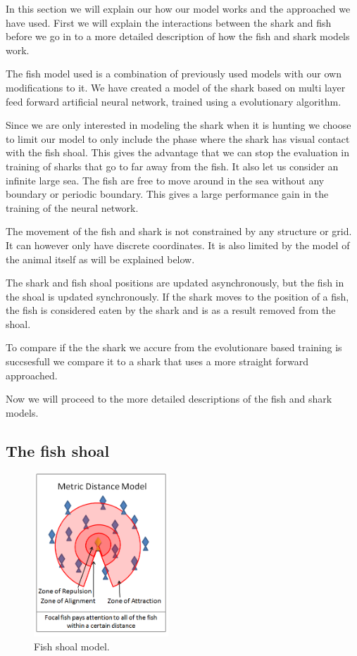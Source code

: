 
In this section we will explain our how our model works and the approached we have used. First we will explain the interactions between the shark and fish before we go in to a more detailed description of how the fish and shark models work.

The fish model used is a combination of previously used models with our own modifications to it. We have created a model of the shark based on multi layer feed forward artificial neural network, trained using a evolutionary  algorithm.

Since we are only interested in modeling the shark when it is hunting we choose to limit our model to only include the phase where the shark has visual contact with the fish shoal. This gives the advantage that we can stop the evaluation in training of sharks that go to far away from the fish. It also let us consider an infinite large sea. The fish are free to move around in the sea without any boundary or periodic boundary. This gives a large performance gain in the training of the neural network.

The movement of the fish and shark is not constrained by any structure or grid. It can however only have discrete coordinates. It is also limited by the model of the animal itself as will be explained below.

The shark and fish shoal positions are updated asynchronously, but the fish in the shoal is updated synchronously. If the shark moves to the position of a fish, the fish is considered eaten by the shark and is as a result removed from the shoal.

To compare if the the shark we accure from the evolutionare based training is succsesfull we compare it to a shark that uses a more straight forward approached.

Now we will proceed to the more detailed descriptions of the fish and shark models.

\subsection{The fish shoal}

\begin{figure}
\centering
\includegraphics[width=0.45\textwidth]{figs/swarmfig.png}
\caption{\label{fig:swarm} Fish shoal model.}
\end{figure}

